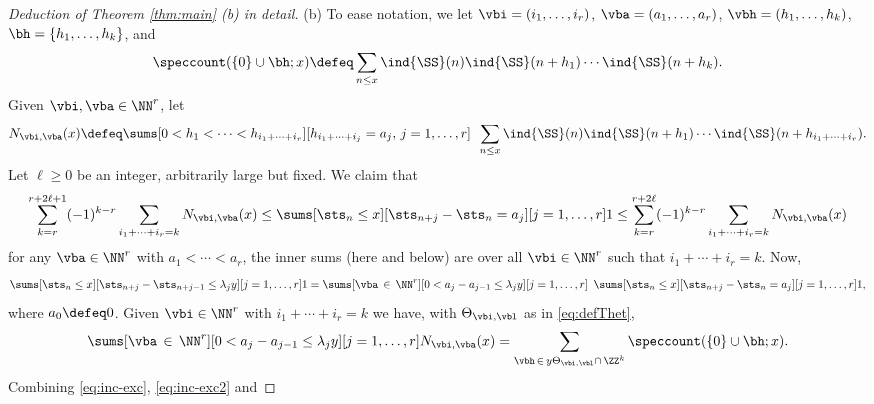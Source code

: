 \documentclass[12pt, reqno, twoside, letterpaper]{amsart}
\begin{document}
\begin{nixnix}
%
\begin{proof}[Deduction of Theorem \ref{thm:main} (b) in detail]
(b) 
% 
To ease notation, we let $\vbi = (i_1,\ldots,i_r)$, 
$\vba = (a_1,\ldots,a_r)$, $\vbh = (h_1,\ldots,h_k)$,  
$\bh = \{h_1,\ldots,h_k\}$, and 
\[
 \speccount(\{0\} \cup \bh; x)
  \defeq 
   \sum_{n \le x} 
    \ind{\SS}(n)\ind{\SS}(n + h_1)\cdots \ind{\SS}(n + h_k).
\]
%
Given $\vbi,\vba \in \NN^r$, let 
\[
 N_{\vbi,\vba}(x)
  \defeq 
   \sums[0 < h_1 < \cdots < h_{i_1 + \cdots + i_r}]
        [h_{i_1 + \cdots + i_j} = a_j, \, j = 1,\ldots,r]
     \hspace{5pt}
      \sum_{n \le x}
       \ind{\SS}(n)\ind{\SS}(n + h_1)\cdots \ind{\SS}(n + h_{i_1 + \cdots + i_r}).
\]
%
Let $\ell \ge 0$ be an integer, arbitrarily large but fixed.
%
We claim that 
\begin{equation}
 \label{eq:inc-exc}
 \sum_{k = r}^{r + 2\ell + 1}
  (-1)^{k - r}
   \sum_{i_1 + \cdots + i_r = k}
    N_{\vbi,\vba}(x)
     \le 
      \sums[\sts_n \le x]
           [\sts_{n + j} - \sts_n = a_j]
           [j = 1,\ldots,r] 1
       \le
        \sum_{k = r}^{r + 2\ell}
         (-1)^{k - r}
          \sum_{i_1 + \cdots + i_r = k}
           N_{\vbi,\vba}(x) 
\end{equation}
for any $\vba \in \NN^r$ with $a_1 < \cdots < a_r$, the inner 
sums (here and below) are over all $\vbi \in \NN^r$ such that 
$i_1 + \cdots + i_r = k$.
%
Now, 
\begin{equation}
 \label{eq:inc-exc2}
  \sums[\sts_n \le x]
       [\sts_{n + j} - \sts_{n + j - 1} \le \lambda_j y]
       [j = 1,\ldots,r] 1
   =
     \sums[\vba \, \in \, \NN^r]
          [0 < a_j - a_{j - 1} \le \lambda_j y]
          [j = 1,\ldots,r]  
       \hspace{5pt} 
        \sums[\sts_n \le x]
             [\sts_{n + j} - \sts_n = a_j]
             [j = 1,\ldots,r] 1,
\end{equation}
where $a_0 \defeq 0$.
%
Given $\vbi \in \NN^r$ with $i_1 + \cdots + i_r = k$ we 
have, with $\Theta_{\vbi,\vbl}$ as in \eqref{eq:defThet}, 
\begin{equation}
 \label{eq:inc-exc3}
 \sums[\vba \, \in \, \NN^r]
      [0 < a_j - a_{j - 1} \le \lambda_j y]
      [j = 1,\ldots,r]
  N_{\vbi,\vba}(x)
   =
    \sum_{\vbh \, \in \, y\Theta_{\vbi,\vbl} \cap \, \ZZ^k}
        \speccount(\{0\} \cup \bh; x).
\end{equation}
%
Combining \eqref{eq:inc-exc}, \eqref{eq:inc-exc2} and 

\end{proof}
\end{nixnix}
\end{document}
